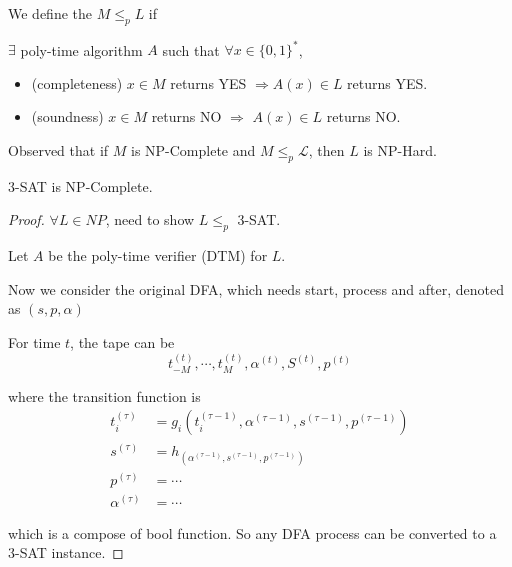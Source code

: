 
We define the   $ M \leq _p L $ if 

$ \exists  $ poly-time algorithm  $ A $ such that  $ \forall x\in \{0,1\}^* $,
\begin{itemize}
    \item (completeness)  $ x\in M $ returns YES $ \Rightarrow A(x)\in L $ returns YES.
\item (soundness)  $ x\in M $ returns NO $ \Rightarrow  $  $ A(x)\in L $  returns NO.  
\end{itemize} 

Observed that if  $ M  $ is NP-Complete and  $ M \leq_p\mathcal L  $, then  $ L $ is NP-Hard.


\begin{theorem}
    3-SAT is NP-Complete.
\end{theorem}
\begin{proof}
    $ \forall L\in NP $, need to show  $ L \leq_p  $ 3-SAT.
    
    Let  $ A  $ be the poly-time verifier (DTM) for  $ L $.

    Now we consider the original DFA, which needs start, process and after, denoted as  $ (s,p,\alpha) $ 

    For time  $ t $, the tape can be 
    \[t_{-M}^{(t)},\cdots,t_M^{(t)},\alpha^{(t)},S^{(t)},p^{(t)}\]

    where the transition function is 
    \begin{align*}
        t_i^{(\tau)}&=g_i(t_i^{(\tau-1)},\alpha^{(\tau-1)},s^{(\tau-1)},p^{(\tau-1)})\\
        s^{(\tau)}&=h_(\alpha^{(\tau-1)},s^{(\tau-1)},p^{(\tau-1)})\\
        p^{(\tau)}&=\cdots\\
        \alpha^{(\tau)}&=\cdots
    \end{align*}

    which is a compose of bool function. So any DFA process can be converted to a 3-SAT instance.
    
\end{proof}

